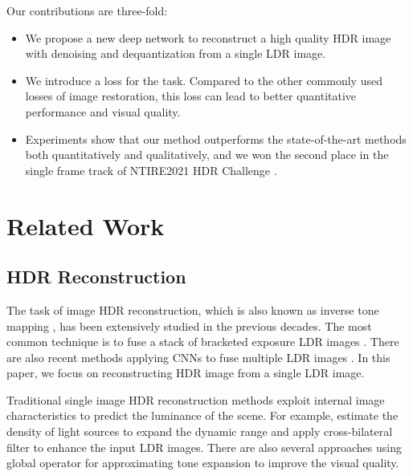\documentclass[final]{cvpr}
\begin{document}
Our contributions are three-fold: 
\begin{itemize}
\setlength{\itemsep}{0pt}
\setlength{\parsep}{0pt}
\setlength{\parskip}{0pt}
\item We propose a new deep network to reconstruct a high quality HDR image with denoising and dequantization from a single LDR image.
\item We introduce a  loss for the task. Compared to the other commonly used losses of image restoration, this loss can lead to better quantitative performance and visual quality.
\item Experiments show that our method outperforms the state-of-the-art methods both quantitatively and qualitatively, and we won the second place in the single frame track of NTIRE2021 HDR Challenge \cite{perez2021ntire}.

\end{itemize}

\section{Related Work}
\subsection{HDR Reconstruction}
The task of image HDR reconstruction, which is also known as inverse tone mapping \cite{banterle2006inverse}, has been extensively studied in the previous decades. The most common technique is to fuse a stack of bracketed exposure LDR images \cite{debevec2008recovering}. There are also recent methods applying CNNs to fuse multiple LDR images \cite{wu2018deep, kalantari2017deep, endo2017deep}. In this paper, we focus on reconstructing HDR image from a single LDR image. 

Traditional single image HDR reconstruction methods exploit internal image characteristics to predict the luminance of the scene. For example, \cite{akyuz2007hdr, banterle2009high, banterle2006inverse, banterle2007framework} estimate the density of light sources to expand the dynamic range and \cite{huo2014physiological, kovaleski2014high} apply cross-bilateral filter to enhance the input LDR images. There are also several approaches \cite{masia2009evaluation, masia2017} using global operator for approximating tone expansion to improve the visual quality. 
\end{document}

